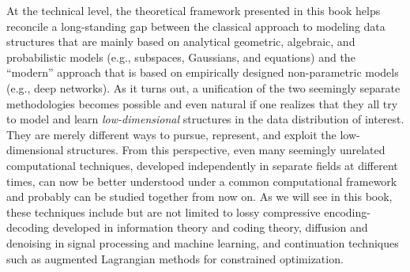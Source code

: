 \documentclass[../../book-main.tex]{subfiles}
\begin{document}
At the technical level, the theoretical framework presented in this book helps reconcile a long-standing gap between the classical approach to modeling data structures that are mainly based on analytical geometric, algebraic, and probabilistic models (e.g., subspaces, Gaussians, and equations) and the ``modern'' approach that is based on empirically designed non-parametric models (e.g., deep networks). As it turns out, a unification of the two seemingly separate methodologies becomes possible and even natural if one realizes that they all try to model and learn {\em low-dimensional} structures in the data distribution of interest. They are merely different ways to pursue, represent, and exploit the low-dimensional structures. From this perspective, even many seemingly unrelated computational techniques, developed independently in separate fields at different times, can now be better understood under a common computational framework and probably can be studied together from now on. As we will see in this book, these techniques include but are not limited to lossy compressive encoding-decoding developed in information theory and coding theory, diffusion and denoising in signal processing and machine learning, and continuation techniques such as augmented Lagrangian methods for constrained optimization. 
\end{document}
